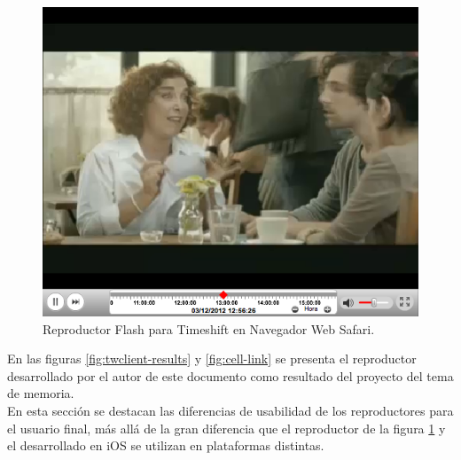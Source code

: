 \begin{figure}[H]
	\centering
	\includegraphics[scale=0.6]{imgs/eag-player.png} 
	\caption{Reproductor Flash para Timeshift en Navegador Web Safari.}
	\label{fig:eag-player}
\end{figure}  

En las figuras \ref{fig:twclient-results} y \ref{fig:cell-link} se presenta el reproductor desarrollado por el autor de este documento como resultado del proyecto del tema de memoria.\\

En esta sección se destacan las diferencias de usabilidad de los reproductores para el usuario final, más allá de la gran diferencia que el reproductor de la figura \ref{fig:eag-player} y el desarrollado en iOS se utilizan en plataformas distintas. 

